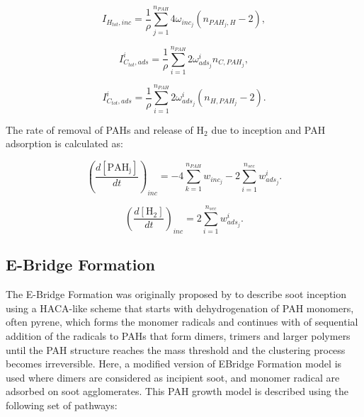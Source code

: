\begin{equation}
	I_{H_{tot},{inc}} = \frac{1}{\rho}
	\sum_{j=1}^{n_{PAH}}
	4\omega_{inc_{j}} 
	\left(
	n_{PAH_j,H}-2
	\right)
	\label{eqn:IHtot_inc_dimcoal},
\end{equation}

\begin{equation}
	I^i_{C_{tot},ads} =
	\frac{1}{\rho}
	\sum_{i=1}^{n_{PAH}}
	2\omega^i_{ads_j}
	n_{C,PAH_j}
	\label{eqn:ICtotads_dimcoal},
\end{equation}

\begin{equation}
	I^i_{C_{tot},ads} =
	\frac{1}{\rho}
	\sum_{i=1}^{n_{PAH}}
	2\omega^i_{ads_j}
	\left(n_{H,PAH_j}-2\right)
	\label{eqn:IHtotads_dimcoal}.
\end{equation}

The rate of removal of PAHs and release of $\mathrm{H_2}$ due to inception and PAH adsorption is calculated as:

\begin{equation}
	\left(
	\frac{d\left[{\mathrm{PAH_j}}\right]}{dt}
	\right)_{inc}
	= 
	-4\sum_{k=1}^{n_{PAH}}w_{inc_{j}}-2\sum_{i=1}^{n_{sec}}w^i_{ads_j}
	\label{eqn:PAHscrub_dimcoal}.
\end{equation}

\begin{equation}
	\left(
	\frac{d\left[{\mathrm{H_2}}\right]}{dt}
	\right)_{inc}
	= 
	2\sum_{i=1}^{n_{sec}}w^i_{ads_j}
	\label{eqn:H2scrub_dimcoal}.
\end{equation}

\subsection{E-Bridge Formation}
The E-Bridge Formation was originally proposed by \citet{frenklach2020mechanism} to describe soot inception using a HACA-like scheme that starts with dehydrogenation of PAH monomers, often pyrene, which forms the monomer radicals and continues with of sequential addition of the radicals to PAHs that form dimers, trimers and larger polymers until the PAH structure reaches the mass threshold and the clustering process becomes irreversible. Here, a modified version of EBridge Formation model is used where dimers are considered as incipient soot, and monomer radical are adsorbed on soot agglomerates. This PAH growth model is described using the following set of pathways:


